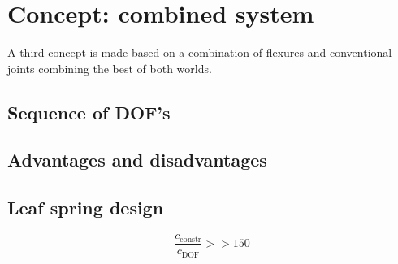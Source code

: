 \section{Concept: combined system}
\label{Concept: combined system}
A third concept is made based on a combination of flexures and conventional joints combining the best of both worlds.   


\subsection{Sequence of DOF's}


\subsection{Advantages and disadvantages}





\subsection{Leaf spring design}

\begin{equation}
\frac{c_{\mathrm{constr}}}{c_{\mathrm{DOF}}}>>150    
\end{equation}

